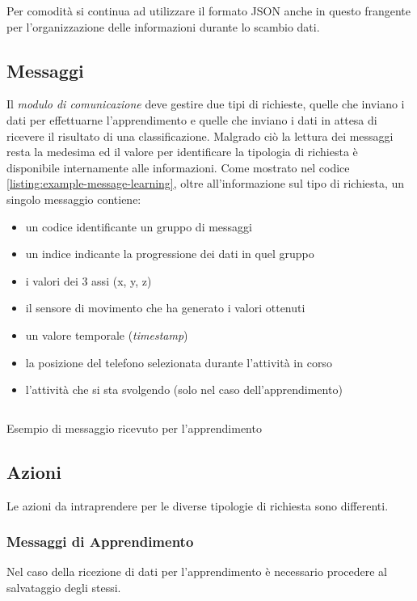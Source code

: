Per comodità si continua ad utilizzare il formato JSON anche in questo frangente per l'organizzazione delle informazioni durante lo scambio dati.


\subsection{Messaggi}
Il \textit{modulo di comunicazione} deve gestire due tipi di richieste, quelle che inviano i dati per effettuarne l'apprendimento e quelle che inviano
i dati in attesa di ricevere il risultato di una classificazione. Malgrado ciò la lettura dei messaggi resta la medesima ed il 
valore per identificare la tipologia di richiesta è disponibile internamente alle informazioni.
\vspace{5mm} %
\newline
Come mostrato nel codice \ref{listing:example-message-learning}, oltre all'informazione sul tipo di richiesta, un singolo messaggio contiene: 
\begin{itemize}
    \item un codice identificante un gruppo di messaggi
    \item un indice indicante la progressione dei dati in quel gruppo
    \item i valori dei 3 assi (x, y, z)
    \item il sensore di movimento che ha generato i valori ottenuti
    \item un valore temporale (\textit{timestamp})
    \item la posizione del telefono selezionata durante l'attività in corso
    \item l'attività che si sta svolgendo (solo nel caso dell'apprendimento)
\end{itemize}
\vfill
\begin{listing}[H] 
    \inputminted[frame=single,framesep=10pt]{json}{assets/snippets/server/receiver/message.json}
    \caption{Esempio di messaggio ricevuto per l'apprendimento}
    \label{listing:example-message-learning}
\end{listing}

\newpage
\subsection{Azioni}
Le azioni da intraprendere per le diverse tipologie di richiesta sono differenti. 

\subsubsection{Messaggi di Apprendimento}
Nel caso della ricezione di dati per l'apprendimento è necessario procedere al salvataggio degli stessi.

